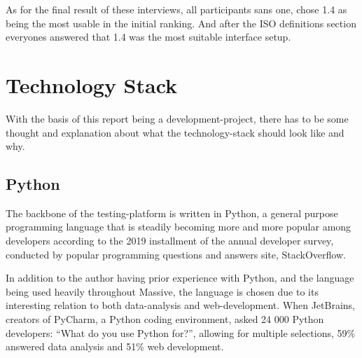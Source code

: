 {    As for the final result of these interviews, all participants sans one, chose 1.4 as being
    the most usable in the initial ranking. And after the ISO definitions
    section everyones answered that 1.4 was the most suitable interface setup.

%
%
%
%
\section{Technology Stack}

  With the basis of this report being a development-project, there has to be
  some thought and explanation about what the technology-stack should look like
  and why.

  \subsection{Python}

  The backbone of the testing-platform is written in  Python\cite{citePython},
  a general purpose programming language that is steadily becoming
  more and more popular among developers according to the 2019 installment of
  the annual developer survey\cite{citeStackOverflow2019Survey},
  conducted by popular programming questions and answers site,
  StackOverflow\cite{citeStackOverflow}.

  In addition to the author having prior experience with Python, and the
  language being used heavily throughout Massive, the language
  is chosen due to its interesting relation to both data-analysis and
  web-development. When
  JetBrains\cite{citeJetBrains},
  creators of
  PyCharm\cite{citePyCharm},
  a Python coding environment, asked 24 000 Python
  developers:
  ``What do you use Python for?''\cite{citeJetSurvey}, allowing for multiple
  selections, 59\% answered data analysis and 51\% web development.

}
